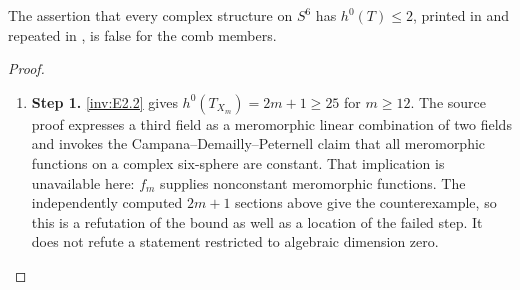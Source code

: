 \begin{proposition}\hypertarget{tag-01SX}{}\label{inv:E2.4}

The assertion that every complex structure on $S^6$ has
$h^0(T)\le2$, printed in
\citet[Corollary 1.3; verified preprint p.~2]{HKP2000}
and repeated in \citet[Remarks 1.2 and 9.26]{AC2026}, is false
for the comb members.
\end{proposition}


\begin{proof}
\begin{enumerate}[label={$\langle1\rangle$\arabic*.},leftmargin=*]
\item 
\noindent\textbf{Step 1.} \ref{inv:E2.2} gives $h^0(T_{X_m})=2m+1\ge25$ for $m\ge12$.
The source proof expresses a third field as a meromorphic linear
combination of two fields and invokes the Campana--Demailly--Peternell
claim that all meromorphic functions on a complex six-sphere are
constant. That implication is unavailable here: $f_m$ supplies
nonconstant meromorphic functions. The independently computed
$2m+1$ sections above give the counterexample, so this is a
refutation of the bound as well as a location of the failed step.
It does not refute a statement restricted to algebraic dimension
zero.

\end{enumerate}
\end{proof}